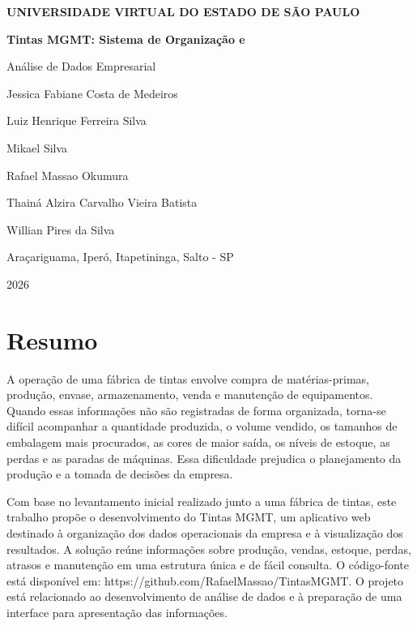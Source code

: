 \documentclass[12pt,a4paper]{article}
\begin{document}
\begin{titlepage}
\centering
\vspace*{2cm}
{\Large\bfseries UNIVERSIDADE VIRTUAL DO ESTADO DE SÃO PAULO\par}
\vspace{2cm}
{\huge\bfseries Tintas MGMT: Sistema de Organização e\par}
\vspace{0.3cm}
{\large Análise de Dados Empresarial\par}
\vspace{3.5cm}
{\normalsize Jessica Fabiane Costa de Medeiros\par}
{\normalsize Luiz Henrique Ferreira Silva\par}
{\normalsize Mikael Silva\par}
{\normalsize Rafael Massao Okumura\par}
{\normalsize Thainá Alzira Carvalho Vieira Batista\par}
{\normalsize Willian Pires da Silva\par}
\vfill
{\normalsize Araçariguama, Iperó, Itapetininga, Salto - SP\par}
{\normalsize 2026\par}
\end{titlepage}
\pagestyle{empty}

\pagebreak
\section*{Resumo}

A operação de uma fábrica de tintas envolve compra de matérias-primas, produção, envase, armazenamento, venda e manutenção de equipamentos. Quando essas informações não são registradas de forma organizada, torna-se difícil acompanhar a quantidade produzida, o volume vendido, os tamanhos de embalagem mais procurados, as cores de maior saída, os níveis de estoque, as perdas e as paradas de máquinas. Essa dificuldade prejudica o planejamento da produção e a tomada de decisões da empresa.

Com base no levantamento inicial realizado junto a uma fábrica de tintas, este trabalho propõe o desenvolvimento do Tintas MGMT, um aplicativo web destinado à organização dos dados operacionais da empresa e à visualização dos resultados. A solução reúne informações sobre produção, vendas, estoque, perdas, atrasos e manutenção em uma estrutura única e de fácil consulta. O código-fonte está disponível em: https://github.com/RafaelMassao/TintasMGMT. O projeto está relacionado ao desenvolvimento de análise de dados e à preparação de uma interface para apresentação das informações.
\end{document}
